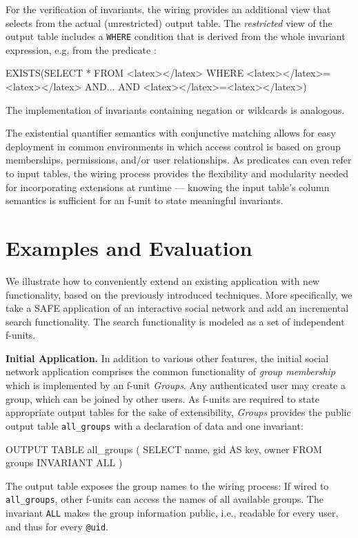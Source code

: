 \documentclass{src/acm_proc_article-sp} \else
\newcommand\myparagraph[1]{\medskip\noindent\textbf{#1.}}
\newcommand\SAFE{SAFE\xspace}
\begin{document}
For the verification of invariants, the wiring provides an additional
view that selects from the actual (unrestricted) output table.
The \emph{restricted} view of the output table includes a
\texttt{WHERE} condition that is derived from the whole invariant
expression, e.g, from the predicate :
\begin{lsthere}
   EXISTS(SELECT * FROM <latex></latex> WHERE <latex></latex>=<latex></latex> AND... AND <latex></latex>=<latex></latex>)
\end{lsthere}
The implementation of invariants containing negation or wildcards is
analogous.



The existential quantifier semantics with conjunctive matching allows
for easy deployment in common environments in which access control is
based on group memberships, permissions, and/or user relationships.
As predicates can even refer to input tables, the wiring process
provides the flexibility and modularity needed for incorporating
extensions at runtime --- knowing the input table's column semantics
is sufficient for an f-unit to state meaningful invariants.





   \section{Examples and Evaluation}
\label{sec:evaluation}

We illustrate how to conveniently extend an existing application with
new functionality, based on the previously introduced techniques.
More specifically, we take a \SAFE application of an interactive
social network and add an incremental search functionality. The search
functionality is modeled as a set of independent f-units.


\myparagraph{Initial Application}
In addition to various other features, the initial social network
application comprises the common functionality of \emph{group
membership} which is implemented by an f-unit \emph{Groups}. Any
authenticated user may create a group, which can be joined by other
users.
As f-units are required to state appropriate output tables for the
sake of extensibility, \emph{Groups} provides the public output table
\texttt{all\_groups} with a declaration of data and one invariant:
\begin{lsthere}
    OUTPUT TABLE all_groups (
      SELECT name, gid AS key, owner FROM groups
      INVARIANT ALL )
\end{lsthere}
The output table exposes the group names to the wiring process: If
wired to \texttt{all\_groups}, other f-units can access the names of
all available groups. The invariant \texttt{ALL} makes the group
information public, i.e., readable for every user, and thus for every
\texttt{@uid}.
\end{document}
